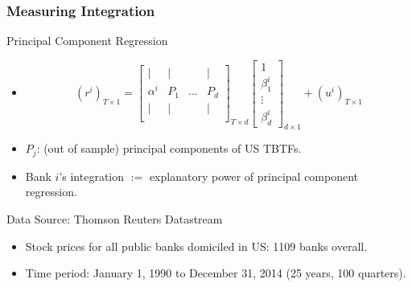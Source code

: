 \documentclass{beamer}
\begin{document}
\begin{frame}
	\frametitle{Measuring Integration}
	\begin{block}{Principal Component Regression}
		\begin{itemize}
			\item 
			\[
			(r^i)_{T\times 1} = \begin{bmatrix}
			\mid   & \mid  &        & \mid \\
			\alpha^i & P_1 & \hdots & P_d\\
			\mid   & \mid  &        & \mid \\
			\end{bmatrix}_{T\times d }
			\begin{bmatrix}
			1\\
			\beta_1^i\\
			\vdots\\
			\beta_d^i
			\end{bmatrix}_{d\times 1}
			+ (u^i)_{T\times 1}
			\]\pause
			\item $P_j$: (out of sample) principal components of US TBTFs.
			\item Bank $i$'s integration $:=$ explanatory power of principal component regression.\pause
			
		\end{itemize}
		
	\end{block}
	
	\begin{block}{Data Source: Thomson Reuters Datastream}
		\begin{itemize}
			\item Stock prices for all public banks domiciled in US: 1109 banks overall.
			\item Time period: January 1, 1990 to December 31, 2014 (25 years, 100 quarters).
		\end{itemize}
		
		
	\end{block}
	
	
	
	
\end{frame}

\end{document}
